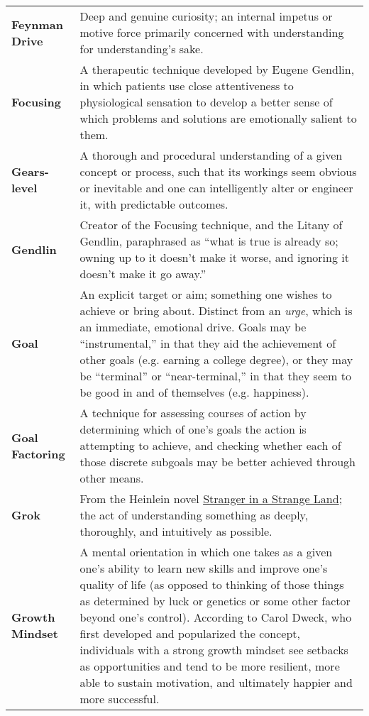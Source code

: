 \begin{longtable} { p{} p{} }
\textbf{Feynman Drive} & Deep and genuine curiosity; an internal impetus or motive force primarily concerned with understanding for understanding's sake.\\

\textbf{Focusing} & A therapeutic technique developed by Eugene Gendlin, in which patients use close attentiveness to physiological sensation to develop a better sense of which problems and solutions are emotionally salient to them.\\

\textbf{Gears-level} & A thorough and procedural understanding of a given concept or process, such that its workings seem obvious or inevitable and one can intelligently alter or engineer it, with predictable outcomes. \\

\textbf{Gendlin} & Creator of the Focusing technique, and the Litany of Gendlin, paraphrased as ``what is true is already so; owning up to it doesn't make it worse, and ignoring it doesn't make it go away.''\\

\textbf{Goal} & An explicit target or aim; something one wishes to achieve or bring about.  Distinct from an \emph{urge}, which is an immediate, emotional drive.  Goals may be ``instrumental,'' in that they aid the achievement of other goals (e.g. earning a college degree), or they may be ``terminal'' or ``near-terminal,'' in that they seem to be good in and of themselves (e.g. happiness).\\

\textbf{Goal Factoring} & A technique for assessing courses of action by determining which of one's goals the action is attempting to achieve, and checking whether each of those discrete subgoals may be better achieved through other means.\\

\textbf{Grok} & From the Heinlein novel \underline{Stranger in a Strange Land}; the act of understanding something as deeply, thoroughly, and intuitively as possible.\\

\textbf{Growth Mindset} & A mental orientation in which one takes as a given one's ability to learn new skills and improve one's quality of life (as opposed to thinking of those things as determined by luck or genetics or some other factor beyond one's control).  According to Carol Dweck, who first developed and popularized the concept, individuals with a strong growth mindset see setbacks as opportunities and tend to be more resilient, more able to sustain motivation, and ultimately happier and more successful.\\


\end{longtable}
